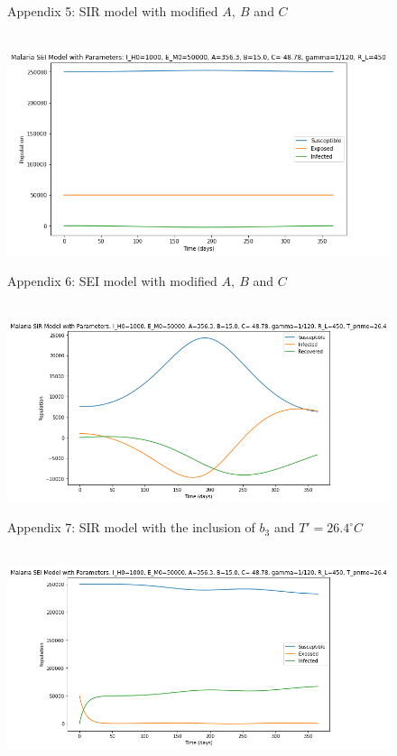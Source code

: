 \documentclass[
	12pt,				%
	oneside,			%
	a4paper,			%
	english,			%
	brazil				%
	]{abntex2}
\begin{document}
\begin{apendicesenv}
\begin{figure}[!ht]
	\caption*{Appendix 5: SIR model with modified $A, \ B$ and $C$}
\end{figure} 
\begin{figure}[!ht]
	\centering
	\hbox{\hspace{2.0em} \includegraphics[scale=0.55] {THESIS-SEI_Aumenta_ABC.png}}
	\caption*{Appendix 6: SEI model with modified $A, \ B$ and $C$}
\end{figure}
\newpage
\begin{figure}[!ht]
	\centering
	\hbox{\hspace{0.8em} \includegraphics[scale=0.55] {THESIS-SIR_Correcao_b3_T_linha_26_4.png}}
	\caption*{Appendix 7: SIR model with the inclusion of $b_3$ and $T'=26.4^\circ C$}
\end{figure} 
\begin{figure}[!ht]
	\centering
	\hbox{\hspace{0.8em} \includegraphics[scale=0.55] {THESIS-SEI_Correcao_b3_T_linha_26_4.png}}

\end{figure}
\end{apendicesenv}
\end{document}
